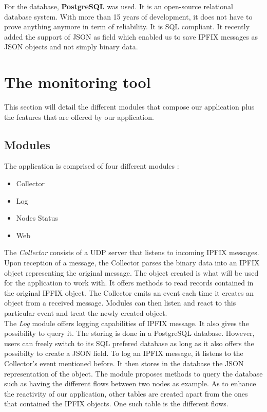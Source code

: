 For the database, \textbf{PostgreSQL} \cite{website:postgresql} was used. It is an open-source relational database system. With more than 15 years of development, it does not have to prove anything anymore in term of reliability. It is SQL compliant. It recently added the support of JSON as field which enabled us to save IPFIX messages as JSON objects and not simply binary data.

\section{The monitoring tool}

This section will detail the different modules that compose our application plus the features that are offered by our application.

\subsection{Modules}

The application is comprised of four different modules :
\begin{itemize}
	\item Collector
	\item Log
	\item Nodes Status
	\item Web \\
\end{itemize}

The \textit{Collector} consists of a UDP server that listens to incoming IPFIX messages. Upon reception of a message, the Collector parses the binary data into an IPFIX object representing the original message. The object created is what will be used for the application to work with. It offers methods to read records contained in the original IPFIX object. The Collector emits an event each time it creates an object from a received message. Modules can then listen and react to this particular event and treat the newly created object. \\

The \textit{Log} module offers logging capabilities of IPFIX message. It also gives the possibility to query it. The storing is done in a PostgreSQL database. However, users can freely switch to its SQL prefered database as long as it also offers the possibilty to create a JSON field. To log an IPFIX message, it listens to the Collector's event mentioned before. It then stores in the database the JSON representation of the object. The module proposes methods to query the database such as having the different flows between two nodes as example. As to enhance the reactivity of our application, other tables are created apart from the ones that contained the IPFIX objects. One such table is the different flows.\\

